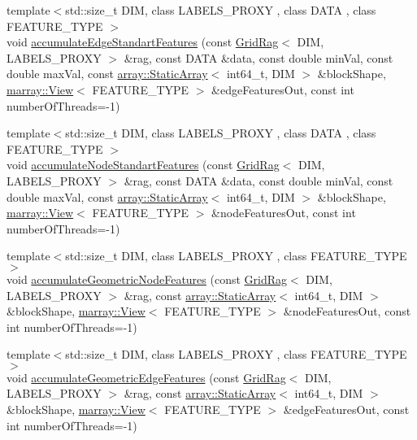 \begin{DoxyCompactItemize}
\item 
{\footnotesize template$<$std\+::size\+\_\+t D\+IM, class L\+A\+B\+E\+L\+S\+\_\+\+P\+R\+O\+XY , class D\+A\+TA , class F\+E\+A\+T\+U\+R\+E\+\_\+\+T\+Y\+PE $>$ }\\void \hyperlink{namespacenifty_1_1graph_a418009772088e19eb7c14b46e6a01eb5}{accumulate\+Edge\+Standart\+Features} (const \hyperlink{classnifty_1_1graph_1_1GridRag}{Grid\+Rag}$<$ D\+IM, L\+A\+B\+E\+L\+S\+\_\+\+P\+R\+O\+XY $>$ \&rag, const D\+A\+TA \&data, const double min\+Val, const double max\+Val, const \hyperlink{namespacenifty_1_1array_a683f151f19c851754e0c6d55ed16a0c2}{array\+::\+Static\+Array}$<$ int64\+\_\+t, D\+IM $>$ \&block\+Shape, \hyperlink{classandres_1_1View}{marray\+::\+View}$<$ F\+E\+A\+T\+U\+R\+E\+\_\+\+T\+Y\+PE $>$ \&edge\+Features\+Out, const int number\+Of\+Threads=-\/1)
\item 
{\footnotesize template$<$std\+::size\+\_\+t D\+IM, class L\+A\+B\+E\+L\+S\+\_\+\+P\+R\+O\+XY , class D\+A\+TA , class F\+E\+A\+T\+U\+R\+E\+\_\+\+T\+Y\+PE $>$ }\\void \hyperlink{namespacenifty_1_1graph_ad7d29a3cfced104a7af73df235b91238}{accumulate\+Node\+Standart\+Features} (const \hyperlink{classnifty_1_1graph_1_1GridRag}{Grid\+Rag}$<$ D\+IM, L\+A\+B\+E\+L\+S\+\_\+\+P\+R\+O\+XY $>$ \&rag, const D\+A\+TA \&data, const double min\+Val, const double max\+Val, const \hyperlink{namespacenifty_1_1array_a683f151f19c851754e0c6d55ed16a0c2}{array\+::\+Static\+Array}$<$ int64\+\_\+t, D\+IM $>$ \&block\+Shape, \hyperlink{classandres_1_1View}{marray\+::\+View}$<$ F\+E\+A\+T\+U\+R\+E\+\_\+\+T\+Y\+PE $>$ \&node\+Features\+Out, const int number\+Of\+Threads=-\/1)
\item 
{\footnotesize template$<$std\+::size\+\_\+t D\+IM, class L\+A\+B\+E\+L\+S\+\_\+\+P\+R\+O\+XY , class F\+E\+A\+T\+U\+R\+E\+\_\+\+T\+Y\+PE $>$ }\\void \hyperlink{namespacenifty_1_1graph_a11bcf8795f57d9e5200fa52c1fb3a883}{accumulate\+Geometric\+Node\+Features} (const \hyperlink{classnifty_1_1graph_1_1GridRag}{Grid\+Rag}$<$ D\+IM, L\+A\+B\+E\+L\+S\+\_\+\+P\+R\+O\+XY $>$ \&rag, const \hyperlink{namespacenifty_1_1array_a683f151f19c851754e0c6d55ed16a0c2}{array\+::\+Static\+Array}$<$ int64\+\_\+t, D\+IM $>$ \&block\+Shape, \hyperlink{classandres_1_1View}{marray\+::\+View}$<$ F\+E\+A\+T\+U\+R\+E\+\_\+\+T\+Y\+PE $>$ \&node\+Features\+Out, const int number\+Of\+Threads=-\/1)
\item 
{\footnotesize template$<$std\+::size\+\_\+t D\+IM, class L\+A\+B\+E\+L\+S\+\_\+\+P\+R\+O\+XY , class F\+E\+A\+T\+U\+R\+E\+\_\+\+T\+Y\+PE $>$ }\\void \hyperlink{namespacenifty_1_1graph_a152a70f798b787b7fe72acfa1927e098}{accumulate\+Geometric\+Edge\+Features} (const \hyperlink{classnifty_1_1graph_1_1GridRag}{Grid\+Rag}$<$ D\+IM, L\+A\+B\+E\+L\+S\+\_\+\+P\+R\+O\+XY $>$ \&rag, const \hyperlink{namespacenifty_1_1array_a683f151f19c851754e0c6d55ed16a0c2}{array\+::\+Static\+Array}$<$ int64\+\_\+t, D\+IM $>$ \&block\+Shape, \hyperlink{classandres_1_1View}{marray\+::\+View}$<$ F\+E\+A\+T\+U\+R\+E\+\_\+\+T\+Y\+PE $>$ \&edge\+Features\+Out, const int number\+Of\+Threads=-\/1)

\end{DoxyCompactItemize}
